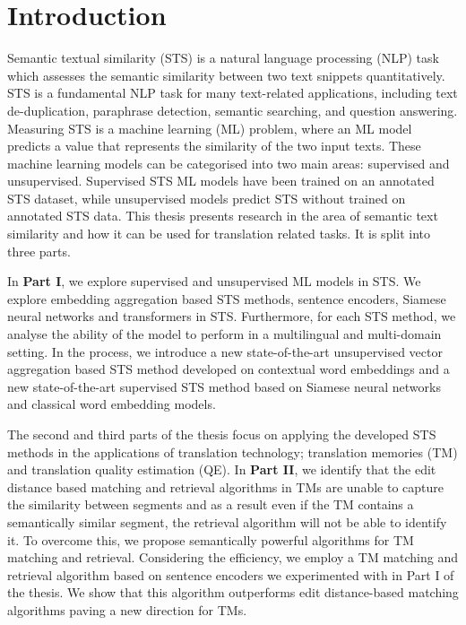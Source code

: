 
\chapter*{Introduction}
\label{cha:introduction}


Semantic textual similarity (STS) is a natural language processing (NLP) task which assesses the semantic similarity between two text snippets quantitatively. STS is a fundamental NLP task for many text-related applications, including text de-duplication, paraphrase detection, semantic searching, and question answering. Measuring STS is a machine learning (ML) problem, where an ML model predicts a value that represents the similarity of the two input texts. These machine learning models can be categorised into two main areas: supervised and unsupervised. Supervised STS ML models have been trained on an annotated STS dataset, while unsupervised models predict STS without trained on annotated STS data. This thesis presents research in the area of semantic text similarity and how it can be used for translation related tasks. It is split into three parts.

In \textbf{Part I}, we explore supervised and unsupervised ML models in STS. We explore embedding aggregation based STS methods, sentence encoders, Siamese neural networks and transformers in STS. Furthermore, for each STS method, we analyse the ability of the model to perform in a multilingual and multi-domain setting. In the process, we introduce a new state-of-the-art unsupervised vector aggregation based STS method developed on contextual word embeddings and a new state-of-the-art supervised STS method based on Siamese neural networks and classical word embedding models. 

The second and third parts of the thesis focus on applying the developed STS methods in the applications of translation technology; translation memories (TM) and translation quality estimation (QE). In \textbf{Part II}, we identify that the edit distance based matching and retrieval algorithms in TMs are unable to capture the similarity between segments and as a result even if the TM contains a semantically similar segment, the retrieval algorithm will not be able to identify it. To overcome this, we propose semantically powerful algorithms for TM matching and retrieval. Considering the efficiency, we employ a TM matching and retrieval algorithm based on sentence encoders we experimented with in Part I of the thesis. We show that this algorithm outperforms edit distance-based matching algorithms paving a new direction for TMs.

